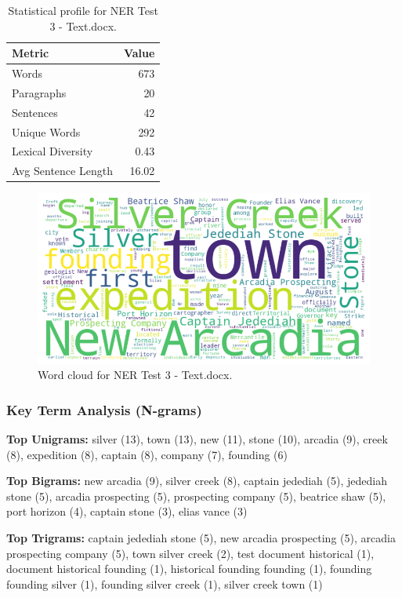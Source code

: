 \begin{table}[!ht]
\centering
\begin{tabular}{lr}
\toprule
\textbf{Metric} & \textbf{Value} \\
\midrule
Words & 673 \\
Paragraphs & 20 \\
Sentences & 42 \\
Unique Words & 292 \\
Lexical Diversity & 0.43 \\
Avg Sentence Length & 16.02 \\
\bottomrule
\end{tabular}
\caption{Statistical profile for NER Test 3 - Text.docx.}
\label{tab:ner3_stats}
\end{table}

\begin{figure}[!ht]
  \centering
  \includegraphics[width=\textwidth]{figures/appendix_fig/GRP002EXP003_eda_wordcloud.png}
  \caption{Word cloud for NER Test 3 - Text.docx.}
  \label{fig:ner3_wordcloud}
\end{figure}

\subsubsection*{Key Term Analysis (N-grams)}
\textbf{Top Unigrams:} 
silver (13), town (13), new (11), stone (10), arcadia (9), creek (8), expedition (8), captain (8), company (7), founding (6)
\par
\textbf{Top Bigrams:} 
new arcadia (9), silver creek (8), captain jedediah (5), jedediah stone (5), arcadia prospecting (5), prospecting company (5), beatrice shaw (5), port horizon (4), captain stone (3), elias vance (3)
\par
\textbf{Top Trigrams:} 
captain jedediah stone (5), new arcadia prospecting (5), arcadia prospecting company (5), town silver creek (2), test document historical (1), document historical founding (1), historical founding founding (1), founding founding silver (1), founding silver creek (1), silver creek town (1)

